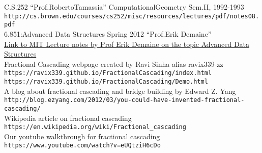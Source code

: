 \documentclass[11pt]{article}
\begin{document}
\pagebreak 
\begin{thebibliography}{}

C.S.252 ``Prof.RobertoTamassia'' ComputationalGeometry Sem.II, 1992-1993
\\
\texttt{http://cs.brown.edu/courses/cs252/misc/resources/lectures/pdf/notes08.pdf} \\


6.851:Advanced Data Structures Spring 2012 ``Prof.Erik Demaine'' \\
\href{https://ocw.mit.edu/courses/electrical-engineering-and-computer-science/6-851-advanced-data-structures-spring-2012/calendar-and-notes/MIT6_851S12_L3.pdf}{Link to MIT Lecture notes by Prof Erik Demaine on the topic Advanced Data Structures} \\


Fractional Cascading webpage created by Ravi Sinha alias ravix339-zz \\
\texttt{https://ravix339.github.io/FractionalCascading/index.html} \\
\texttt{https://ravix339.github.io/FractionalCascading/Demo.html} \\

A blog about fractional cascading and bridge building by Edward Z. Yang \\
\texttt{http://blog.ezyang.com/2012/03/you-could-have-invented-fractional-cascading/} \\

Wikipedia article on fractional cascading \\
\texttt{https://en.wikipedia.org/wiki/Fractional\_cascading} \\


Our youtube walkthrough for fractional cascading \\
\texttt{https://www.youtube.com/watch?v=eUQtziH6cDo} \\

\end{thebibliography}
\end{document}
